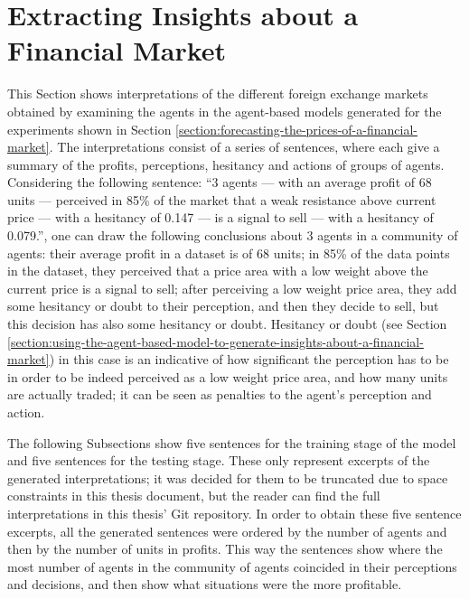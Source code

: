 \newpage

\section{Extracting Insights about a Financial Market}
\label{section:extracting-insights-about-a-financial-market}

This Section shows interpretations of the different foreign exchange markets
obtained by examining the agents in the agent-based models generated for the
experiments shown in Section
\ref{section:forecasting-the-prices-of-a-financial-market}. The interpretations
consist of a series of sentences, where each give a summary of the profits,
perceptions, hesitancy and actions of groups of agents. Considering the
following sentence: ``3 agents — with an average profit of 68 units — perceived
in 85\% of the market that a weak resistance above current price — with a
hesitancy of 0.147 — is a signal to sell — with a hesitancy of 0.079.'', one can
draw the following conclusions about 3 agents in a community of agents: their
average profit in a dataset is of 68 units; in 85\% of the data points in the
dataset, they perceived that a price area with a low weight above the current
price is a signal to sell; after perceiving a low weight price area, they add
some hesitancy or doubt to their perception, and then they decide to sell, but
this decision has also some hesitancy or doubt. Hesitancy or doubt (see Section
\ref{section:using-the-agent-based-model-to-generate-insights-about-a-financial-market})
in this case is an indicative of how significant the perception has to be in
order to be indeed perceived as a low weight price area, and how many units are
actually traded; it can be seen as penalties to the agent's perception and
action.

The following Subsections show five sentences for the training stage of the
model and five sentences for the testing stage. These only represent excerpts of
the generated interpretations; it was decided for them to be truncated due to
space constraints in this thesis document, but the reader can find the full
interpretations in this thesis' Git repository. In order to obtain these five
sentence excerpts, all the generated sentences were ordered by the number of
agents and then by the number of units in profits. This way the sentences show
where the most number of agents in the community of agents coincided in their
perceptions and decisions, and then show what situations were the more
profitable.

